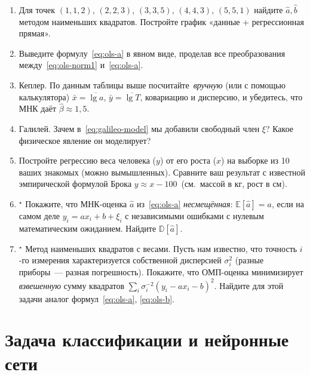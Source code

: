 \begin{tasksbox}
\begin{enumerate}\itemsep1pt
  \item Для точек $(1,1{,}2)$, $(2,2{,}3)$, $(3,3{,}5)$, $(4,4{,}3)$,
        $(5,5{,}1)$ найдите $\hat a,\hat b$ методом наименьших квадратов.
        Постройте график «данные + регрессионная прямая».
  \item Выведите формулу~\eqref{eq:ols-a} в явном виде, проделав все
        преобразования между~\eqref{eq:ols-norm1} и~\eqref{eq:ols-a}.
  \item Кеплер. По данным таблицы выше посчитайте~\emph{вручную} (или с
        помощью калькулятора) $\bar x=\overline{\lg a}$,
        $\bar y=\overline{\lg T}$, ковариацию и дисперсию, и убедитесь,
        что МНК даёт $\hat\beta\approx 1{,}5$.
  \item Галилей. Зачем в~\eqref{eq:galileo-model} мы добавили свободный
        член $\xi$? Какое физическое явление он моделирует?
  \item Постройте регрессию веса человека ($y$) от его роста ($x$) на
        выборке из 10 ваших знакомых (можно вымышленных). Сравните ваш
        результат с известной эмпирической формулой Брока
        $y\approx x-100$~(см.\ массой в кг, рост в см).
  \item$^{\star}$ Покажите, что МНК-оценка $\hat a$ из~\eqref{eq:ols-a}
        \emph{несмещённая}: $\mathbb E[\hat a]=a$, если на самом деле
        $y_i=a x_i+b+\xi_i$ с независимыми ошибками с нулевым
        математическим ожиданием. Найдите $\mathbb D[\hat a]$.
  \item$^{\star}$ Метод наименьших квадратов с весами. Пусть нам
        известно, что точность $i$-го измерения характеризуется
        собственной дисперсией $\sigma_i^{2}$ (разные приборы~--- разная
        погрешность). Покажите, что ОМП-оценка минимизирует
        \emph{взвешенную} сумму квадратов
        $\sum_{i}\sigma_i^{-2}(y_i-a x_i-b)^{2}$. Найдите для этой
        задачи аналог формул~\eqref{eq:ols-a}, \eqref{eq:ols-b}.
\end{enumerate}
\end{tasksbox}

\section{Задача классификации и нейронные сети}
\label{sec:nn}

